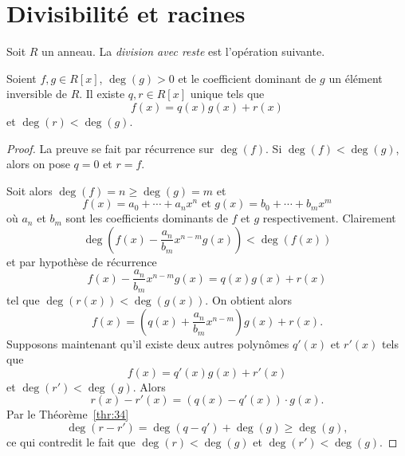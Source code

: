 \section{Divisibilité et racines} 
\label{sec:divisibilite}
Soit $R$ un anneau. La \emph{division avec reste} est l'opération suivante. 

\begin{theorem}
  \label{thr:33}
  Soient $f,g \in R[x]$, $\deg(g) >0$ et le coefficient dominant de $g$ un élément  inversible de $R$.   Il existe $q,r \in R[x]$ unique  tels que 
  \begin{displaymath}
    f(x) = q(x) g(x) + r(x) 
  \end{displaymath}
  et $\deg(r) < \deg(g)$. 
\end{theorem}


\begin{proof}
  La preuve se fait par récurrence sur $\deg(f)$. Si $\deg(f) < \deg(g)$, alors on pose $q = 0$ et $r = f$.

Soit alors $\deg(f) = n \geq \deg(g)=m$ et 
\begin{displaymath}
  f(x) = a_0+ \cdots +a_n x^n \text{ et } g(x) = b_0 + \cdots + b_m x^m 
\end{displaymath}
où $a_n$ et $b_m$ sont les coefficients dominants de $f$ et $g$ respectivement. 
Clairement 
\begin{displaymath}
  \deg\left( f(x) - \frac{a_n}{ b_m } x^{n-m} g(x) \right) < \deg(f(x))
\end{displaymath}
et par hypothèse de récurrence 
\begin{displaymath}
  f(x) - \frac{a_n}{ b_m } x^{n-m} g(x)  = q(x) g(x) + r(x) 
\end{displaymath}
tel que $\deg(r(x)) < \deg(g(x))$. On  obtient alors
\begin{displaymath}
  f(x) = \left(q(x) + \frac{a_n}{ b_m } x^{n-m} \right) g(x) + r(x). 
\end{displaymath}
%
Supposons maintenant qu'il existe deux autres polynômes $q'(x)$ et $r'(x)$ tels que 
\begin{displaymath}
    f(x) = q'(x) g(x) + r'(x) 
  \end{displaymath}
  et $\deg(r') < \deg(g)$. 
Alors 
\begin{displaymath}
   r(x) - r'(x) = (q(x) - q'(x)) ⋅ g(x). 
\end{displaymath}
Par le Théorème~\ref{thr:34}
\begin{displaymath}
 \deg( r - r')  = \deg(q - q') + \deg(g) \geq \deg(g), 
\end{displaymath}
ce qui contredit le fait que $\deg(r) < \deg(g)$ et $\deg(r') < \deg(g)$. 
\end{proof}


